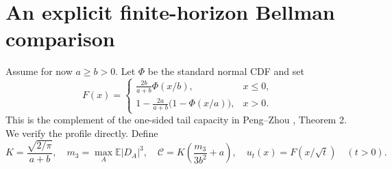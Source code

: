 \documentclass[11pt,a4paper]{article}
\newcommand{\E}{\mathbb E}
\begin{document}
\section{An explicit finite-horizon Bellman comparison}
Assume for now $a\ge b>0$. Let $\Phi$ be the standard normal CDF and set
\begin{equation}\label{eq:F}
F(x)=\begin{cases}
\displaystyle\frac{2b}{a+b}\Phi(x/b),&x\le0,\\[5pt]
\displaystyle1-\frac{2a}{a+b}\bigl(1-\Phi(x/a)\bigr),&x>0.
\end{cases}
\end{equation}
This is the complement of the one-sided tail capacity in
Peng--Zhou \cite{PZ19}, Theorem 2. We verify the profile directly. Define
\[
K=\frac{\sqrt{2/\pi}}{a+b},\quad
m_3=\max_A\E|D_A|^3,\quad
\mathcal C=K\left(\frac{m_3}{3b^2}+a\right),\quad
u_t(x)=F(x/\sqrt t)\quad(t>0).
\]
\end{document}
